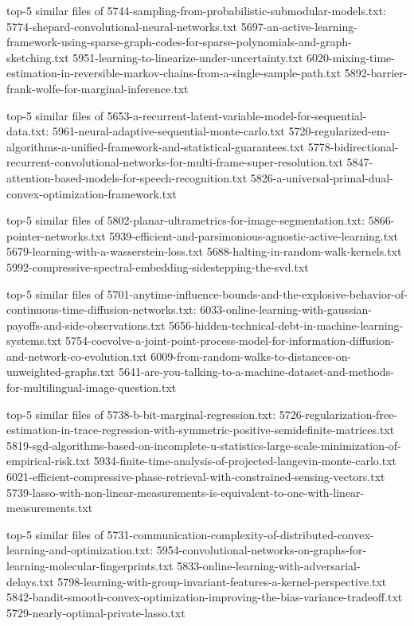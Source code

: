 \documentclass[11pt]{article}
\begin{document}
top-5 similar files of
5744-sampling-from-probabilistic-submodular-models.txt:
5774-shepard-convolutional-neural-networks.txt
5697-an-active-learning-framework-using-sparse-graph-codes-for-sparse-polynomials-and-graph-sketching.txt
5951-learning-to-linearize-under-uncertainty.txt
6020-mixing-time-estimation-in-reversible-markov-chains-from-a-single-sample-path.txt
5892-barrier-frank-wolfe-for-marginal-inference.txt

top-5 similar files of
5653-a-recurrent-latent-variable-model-for-sequential-data.txt:
5961-neural-adaptive-sequential-monte-carlo.txt
5720-regularized-em-algorithms-a-unified-framework-and-statistical-guarantees.txt
5778-bidirectional-recurrent-convolutional-networks-for-multi-frame-super-resolution.txt
5847-attention-based-models-for-speech-recognition.txt
5826-a-universal-primal-dual-convex-optimization-framework.txt

top-5 similar files of
5802-planar-ultrametrics-for-image-segmentation.txt:
5866-pointer-networks.txt
5939-efficient-and-parsimonious-agnostic-active-learning.txt
5679-learning-with-a-wasserstein-loss.txt
5688-halting-in-random-walk-kernels.txt
5992-compressive-spectral-embedding-sidestepping-the-svd.txt

top-5 similar files of
5701-anytime-influence-bounds-and-the-explosive-behavior-of-continuous-time-diffusion-networks.txt:
6033-online-learning-with-gaussian-payoffs-and-side-observations.txt
5656-hidden-technical-debt-in-machine-learning-systems.txt
5754-coevolve-a-joint-point-process-model-for-information-diffusion-and-network-co-evolution.txt
6009-from-random-walks-to-distances-on-unweighted-graphs.txt
5641-are-you-talking-to-a-machine-dataset-and-methods-for-multilingual-image-question.txt

top-5 similar files of 5738-b-bit-marginal-regression.txt:
5726-regularization-free-estimation-in-trace-regression-with-symmetric-positive-semidefinite-matrices.txt
5819-sgd-algorithms-based-on-incomplete-u-statistics-large-scale-minimization-of-empirical-risk.txt
5934-finite-time-analysis-of-projected-langevin-monte-carlo.txt
6021-efficient-compressive-phase-retrieval-with-constrained-sensing-vectors.txt
5739-lasso-with-non-linear-measurements-is-equivalent-to-one-with-linear-measurements.txt

top-5 similar files of
5731-communication-complexity-of-distributed-convex-learning-and-optimization.txt:
5954-convolutional-networks-on-graphs-for-learning-molecular-fingerprints.txt
5833-online-learning-with-adversarial-delays.txt
5798-learning-with-group-invariant-features-a-kernel-perspective.txt
5842-bandit-smooth-convex-optimization-improving-the-bias-variance-tradeoff.txt
5729-nearly-optimal-private-lasso.txt
\end{document}
